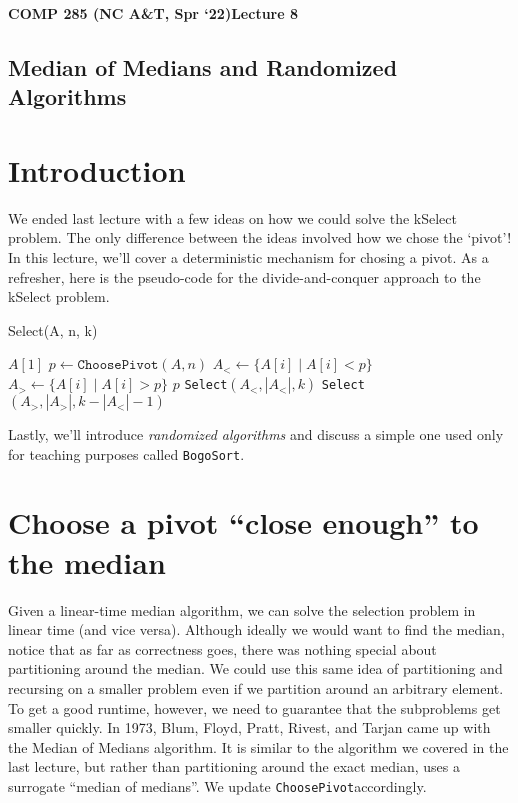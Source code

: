\documentclass [12pt]{article}
\begin{document}
 

{\LARGE \textbf {COMP 285 (NC A\&T, Spr `22)}\hfill \textbf {Lecture 8} } 

\begin{centering}
\section*{Median of Medians and Randomized Algorithms}
\end{centering}

\section{Introduction}
We ended last lecture with a few ideas on how we could solve the kSelect problem. The only difference between the ideas involved how we chose the `pivot'! In this lecture, we'll cover a deterministic mechanism for chosing a pivot. As a refresher, here is the pseudo-code for the divide-and-conquer approach to the kSelect problem.

\begin{algorithm}
\caption{Select(A, n, k)}\label{alg:select}
\begin{algorithmic}
    \RETURN $A[1]$
\ENDIF
\STATE $p \gets \texttt{ChoosePivot}(A, n)$
\STATE $A_< \gets \{A[i] \mid A[i] < p \}$
\STATE $A_> \gets \{A[i] \mid A[i] > p \}$
    \RETURN $p$
    \RETURN \texttt{Select}$(A_<, |A_<|, k)$
    \RETURN \texttt{Select}$(A_>, |A_>|, k - |A_<| - 1)$
\ENDIF
\end{algorithmic}
\end{algorithm}

Lastly, we'll introduce \textit{randomized algorithms} and discuss a simple one used only for teaching purposes called \texttt{BogoSort}.


\section{Choose a pivot ``close enough'' to the median}
Given a linear-time median algorithm, we can solve the selection problem in linear time (and vice versa). Although ideally we would want to find the median, notice that as far as correctness goes, there was nothing special about partitioning around the median. We could use this same idea of partitioning and recursing on a smaller problem even if we partition around an arbitrary element. To get a good runtime, however, we need to guarantee that the subproblems get smaller quickly. In 1973, Blum, Floyd, Pratt, Rivest, and Tarjan came up with the Median of Medians algorithm. It is similar to the algorithm we covered in the last lecture, but rather than partitioning around the exact median, uses a surrogate ``median of medians''. We update \texttt{ChoosePivot}accordingly.
\end{document}
